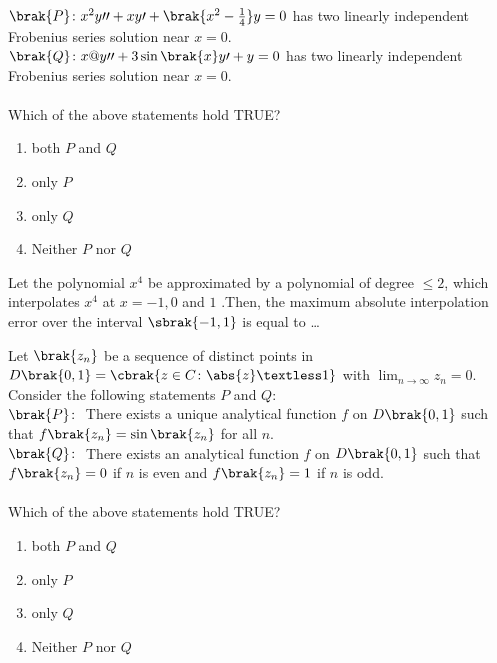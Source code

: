     $\brak{P}\colon x^2y\prime\prime+xy\prime+\brak{x^2-\frac{1}{4}}y=0$ has two linearly independent Frobenius series solution near $x=0$.\\
    $\brak{Q}\colon x@y\prime\prime+3\sin\brak{x}y\prime+y=0$ has two linearly independent Frobenius series solution near $x=0$.\\ \\
    Which of the above statements hold TRUE?
    \begin{enumerate}
        \item both $P$ and $Q$
        \item only $P$
        \item only $Q$
        \item Neither $P$ nor $Q$
    \end{enumerate}
    \item Let the polynomial $x^4$ be approximated by a polynomial of degree $\leq 2$, which interpolates $x^4$ at $x=-1,0$ and $1$ .Then, the maximum absolute interpolation error over the interval $\sbrak{-1,1}$ is equal to \dots
    \item Let $\brak{z_n}$ be a sequence of distinct points in $D\brak{0,1}=\cbrak{z\in C\colon \abs{z}\textless1}$ with $\lim_{n\to \infty}z_n=0.$ Consider the following statements $P$ and $Q\colon$\\
    $\brak{P}\colon$ There exists a unique analytical function $f$ on $D\brak{0,1}$ such that $f\brak{z_n}=\sin\brak{z_n}$ for all $n$.\\
    $\brak{Q}\colon$ There exists an analytical function $f$ on $D\brak{0,1}$ such that $f\brak{z_n}=0$ if  $n$ is even and $f\brak{z_n}=1$ if $n$ is odd.\\ \\
    Which of the above statements hold TRUE?
    \begin{enumerate}
        \item both $P$ and $Q$
        \item only $P$
        \item only $Q$
        \item Neither $P$ nor $Q$
    \end{enumerate}
